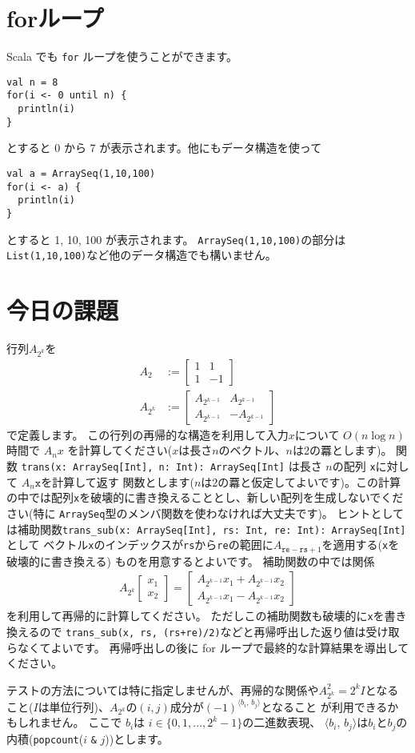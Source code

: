 \documentclass[a4paper,twoside,onecolumn,openany,article]{memoir}
\theoremstyle{remark}
\begin{document}
\section{forループ}
Scala でも \texttt{for} ループを使うことができます。
\begin{verbatim}
val n = 8
for(i <- 0 until n) {
  println(i)
}
\end{verbatim}
とすると 0 から 7 が表示されます。他にもデータ構造を使って
\begin{verbatim}
val a = ArraySeq(1,10,100)
for(i <- a) {
  println(i)
}
\end{verbatim}
とすると 1, 10, 100 が表示されます。
\texttt{ArraySeq(1,10,100)}の部分は
\texttt{List(1,10,100)}など他のデータ構造でも構いません。

\section{今日の課題}
行列$A_{2^k}$を
\begin{align*}
A_2 &:= \begin{bmatrix}1&1\\1&-1\end{bmatrix}\\
A_{2^k} &:= \begin{bmatrix}A_{2^{k-1}}&A_{2^{k-1}}\\A_{2^{k-1}}&-A_{2^{k-1}}\end{bmatrix}
\end{align*}
で定義します。
この行列の再帰的な構造を利用して入力$x$について $O(n\log n)$時間で $A_{n} x$ を計算してください($x$は長さ$n$のベクトル、$n$は2の羃とします)。
関数 \texttt{trans(x: ArraySeq[Int], n: Int): ArraySeq[Int]} は長さ $n$の配列 \texttt{x}に対して $A_n \mathtt{x}$を計算して返す
関数とします($n$は2の羃と仮定してよいです)。この計算の中では配列\texttt{x}を破壊的に書き換えることとし、新しい配列を生成しないでください(特に \texttt{ArraySeq}型のメンバ関数を使わなければ大丈夫です)。
ヒントとしては補助関数\texttt{trans\_sub(x: ArraySeq[Int], rs: Int, re: Int): ArraySeq[Int]} として
ベクトル\texttt{x}のインデックスが\texttt{rs}から\texttt{re}の範囲に$A_{\mathtt{re}-\mathtt{rs}+1}$を適用する(\texttt{x}を破壊的に書き換える)
ものを用意するとよいです。
補助関数の中では関係
\begin{align*}
A_{2^k}\begin{bmatrix}x_1\\x_2\end{bmatrix} =
\begin{bmatrix}A_{2^{k-1}}x_1+ A_{2^{k-1}}x_2\\A_{2^{k-1}}x_1- A_{2^{k-1}}x_2\end{bmatrix}
\end{align*}
を利用して再帰的に計算してください。
ただしこの補助関数も破壊的に\texttt{x}を書き換えるので
\texttt{trans\_sub(x, rs, (rs+re)/2)}などと再帰呼出した返り値は受け取らなくてよいです。
再帰呼出しの後に for ループで最終的な計算結果を導出してください。

テストの方法については特に指定しませんが、再帰的な関係や$A_{2^k}^2=2^k I$となること($I$は単位行列)、$A_{2^k}$の$(i,j)$成分が$(-1)^{\langle b_i,\, b_j\rangle}$となること
が利用できるかもしれません。
ここで $b_i$は $i\in\{0,1,\dotsc,2^k-1\}$の二進数表現、 $\langle b_i,\, b_j\rangle$は$b_i$と$b_j$の内積(\texttt{popcount}($i$ \texttt{\&} $j$))とします。
 
\end{document}
